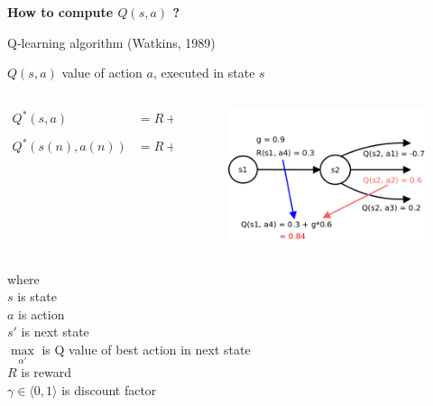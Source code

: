 \documentclass[xcolor=dvipsnames]{beamer}
\begin{document}
\begin{frame}{\bf How to compute $Q(s, a)$ ?}

Q-learning algorithm (Watkins, 1989)

$Q(s, a)$ value of action $a$, executed in state $s$

\begin{columns}
\begin{column}{0.5\textwidth}

  \begin{align*}
  Q^*(s, a) &= R + \gamma \max \limits_{\alpha'} Q(s', \alpha') \\
  Q^*(s(n), a(n)) &= R + \gamma \max \limits_{\alpha'} Q(s(n+1), \alpha')
  \end{align*}

\end{column}
\begin{column}{0.5\textwidth}  %
  \begin{figure}[!htb]
    \centering
    \includegraphics[scale=0.2]{./diagrams/q_learning_detail.png}
  \end{figure}
\end{column}
\end{columns}

where \\
$s$ is state \\
$a$ is action \\
$s'$ is next state \\
$\max \limits_{\alpha'}$ is Q value of best action in next state \\
$R$ is reward \\
$\gamma \in \langle 0, 1 \rangle$ is discount factor \\

\end{frame}
\end{document}
